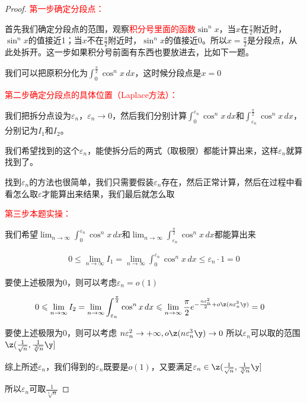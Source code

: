 \begin{proof}
\textcolor{red}{第一步\;确定分段点：}

首先我们确定分段点的范围，观察\textcolor{red}{积分号里面的函数}$\sin^n x$，当$x$在$\frac{\pi}{2}$附近时，$\sin^n x$的值接近1；当$x$不在$\frac{\pi}{2}$附近时，$\sin^n x$的值接近0。所以$x=\frac{\pi}{2} $是分段点，从此处拆开。这一步如果积分号前面有东西也要放进去，比如下一题。

我们可以把原积分化为$\displaystyle \int_{0}^{\frac{\pi}{2}} \cos^n x \,dx$，这时候分段点是$x=0$

\textcolor{red}{第二步\;确定分段点的具体位置（Laplace方法）：}

我们把拆分点设为$\varepsilon_n $，$\varepsilon_n \to 0$，然后我们分别计算$\displaystyle \int_{0}^{\varepsilon_n} \cos^n x \,dx$和$\displaystyle \int_{\varepsilon_n}^{\frac{\pi}{2}} \cos^n x \,dx$，分别记为$I_1$和$I_2$。

我们希望找到的这个$\varepsilon_n$，能使拆分后的两式（取极限）都能计算出来，这样$\varepsilon_n$就算找到了。

找到$\varepsilon_n$的方法也很简单，我们只需要假装$\varepsilon_n$存在，然后正常计算，然后在过程中看看怎么取$\varepsilon$才能算出来结果，我们最后就怎么取

\textcolor{red}{第三步\;本题实操：}

我们希望$\displaystyle \lim_{n\to\infty} \int_{0}^{\varepsilon_n} \cos^n x \,dx $和$\displaystyle \lim_{n\to\infty} \int_{\varepsilon_n}^{\frac{\pi}{2}} \cos^n x \,dx $都能算出来

\begin{align*}
0\leqslant\lim_{n\to\infty} I_1=
\lim_{n\to\infty} \int_{0}^{\varepsilon_n} \cos^n x \,dx 
\leqslant \varepsilon_n \cdot 1 =0
\end{align*}

要使上述极限为0，则可以考虑$\varepsilon_n=o(1) $

\begin{align*}
0\leqslant \lim_{n\to\infty} I_2=
\lim_{n\to\infty} \int_{\varepsilon_n}^{\frac{\pi}{2}} \cos^n x \,dx 
&\leqslant\lim_{n\to\infty} \frac{\pi}{2}
e^{-\frac{n\varepsilon_n^2}{2}+o\z(n\varepsilon_n^3\y)}=0
\end{align*}

要使上述极限为0，则可以考虑
$n\varepsilon_n^2 \to +\infty, o\z(n\varepsilon_n^3\y) \to 0 $
所以$\varepsilon_n$可以取的范围$\z(\frac{1}{\sqrt{n}},\frac{1}{\sqrt[3]{n}} \y]$

综上所述$\varepsilon_n $，我们得到的$\varepsilon_n$既要是$o(1)$，又要满足$\varepsilon_n\in\z(\frac{1}{\sqrt{n}},\frac{1}{\sqrt[3]{n}} \y]$

所以$\varepsilon_n$可取$\frac{1}{\sqrt[3]{n}}$
\end{proof}

